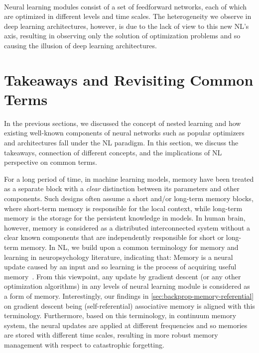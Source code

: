 {~
~
~
\begin{myboxi}
    Neural learning modules consist of a set of feedforward networks, each of which are optimized in different levels and time scales. The heterogeneity we observe in deep learning architectures, however, is due to the lack of view to this new NL's axis, resulting in observing only the solution of optimization problems and so causing the illusion of deep learning architectures.  
\end{myboxi}




\section{Takeaways and Revisiting Common Terms}\label{sec:revisit}
In the previous sections, we discussed the concept of nested learning and how existing well-known components of neural networks such as popular optimizers and architectures fall under the NL paradigm. In this section, we discuss the takeaways, connection of different concepts, and the implications of NL perspective on common terms. 

 For a long period of time, in machine learning models, memory have been treated as a separate block with a \emph{clear} distinction between its parameters and other components. Such designs often assume a short and/or long-term memory blocks, where short-term memory is responsible for the local context, while long-term memory is the storage for the persistent knowledge in models. In human brain, however, memory is considered as a distributed interconnected system without a clear known components that are independently responsible for short or long-term memory. In NL, we build upon a common terminology for memory and learning in neuropsychology literature, indicating that: Memory is a neural update caused by an input and so learning is the process of acquiring useful memory~\citep{okano2000learning}. From this viewpoint, any update by gradient descent (or any other optimization algorithms) in any levels of neural learning module is considered as a form of memory. Interestingly, our findings in \autoref{sec:backprop-memory-referential} on gradient descent being (self-referential) associative memory is aligned with this terminology. Furthermore, based on this terminology, in continuum memory system, the neural updates are applied at different frequencies and so memories are stored with different time scales, resulting in more robust memory management with respect to catastrophic forgetting.  


}
